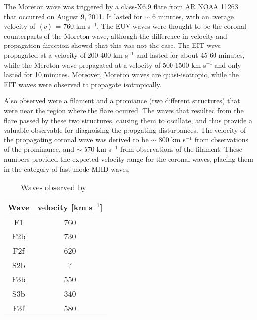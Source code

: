 \documentclass[preprint2]{aastex}
\begin{document}
The Moreton wave was triggered by
a class-X6.9 flare from AR NOAA 11263 that occurred on August 9, 2011.
It lasted for $\sim$ 6 minutes, with an average
velocity of $\left\langle v \right\rangle$ = 760 km s$^{-1}$.
The EUV waves were thought to be the coronal counterparts of the
Moreton wave, although the difference in velocity and propagation
direction showed that this was not the case.
The EIT wave propagated at a velocity of 200-400 km s$^{-1}$ and lasted for
about 45-60 minutes, while the Moreton wave propagated at a velocity
of 500-1500 km s$^{-1}$ and only lasted for 10 minutes.
Moreover, Moreton waves are quasi-isotropic, while the EIT waves were observed to
propagate isotropically.

Also observed were a filament and a promiance (two different structures)
that were near the region where the flare ocurred. The waves that resulted
from the flare passed by these two structures, causing them to oscillate,
and thus provide a valuable observable for diagnoising the propgating
disturbances.
The velocity of the propagating coronal wave was derived to be
$\sim$ 800 km s$^{-1}$ from observations of the prominance, and
$\sim$ 570 km s$^{-1}$ from observations of the filament.
These numbers provided the expected velocity range for the coronal
waves, placing them in the category of fast-mode MHD waves.

\begin{table}[h]
    \centering
    \begin{tabular}{c c}
         \hline\hline
         Wave & velocity [km s$^{-1}$]\\
         \hline
         F1 & 760\\
         F2b & 730\\
         F2f & 620\\
         S2b & ?\\
         F3b & 550\\
         S3b & 340\\
         F3f & 580\\
         \hline
    \end{tabular}\\
    \caption{Waves observed by~\cite{pfw_1}}
    \label{table:lines}
\end{table}

\end{document}

